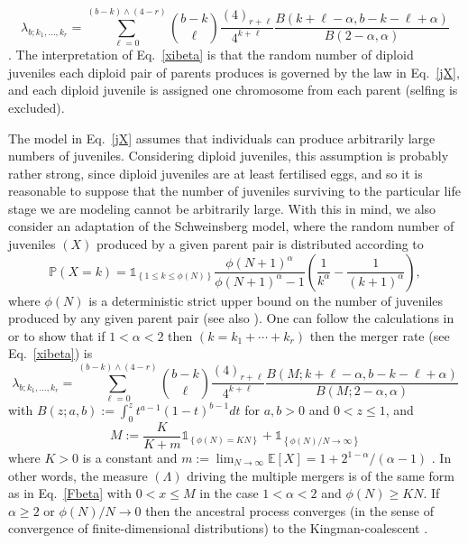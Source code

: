 \documentclass{article}
\newcommand{\be}{\begin{equation}}
\newcommand{\ee}{\end{equation}}
\newcommand{\EE}[1]{\ensuremath{\mathds{E}\left[ #1 \right]}}%
\newcommand{\one}[1]{\ensuremath{\mathds{1}_{\left\{ #1 \right\}}}}%
\newcommand{\prb}[1]{\ensuremath{\mathds{P}\left( #1 \right) } }%
\begin{document}
\be\label{xibeta}
   \lambda_{b;k_1, \ldots, k_r} = \sum_{\ell = 0}^{ (b - k)\wedge (4-r) } \binom{b-k}{\ell} \frac{ (4)_{r+\ell} }{4^{k+\ell}} \frac{B(k+\ell - \alpha, b-k-\ell + \alpha ) }{B(2-\alpha,\alpha)}
\ee
\citep{Blath2016,BLS15}. The interpretation of Eq.\ \eqref{xibeta} is  that the random   number of diploid  juveniles each  diploid pair of parents  produces  is  governed by  the law in Eq.\ \eqref{jX},   and   each diploid juvenile  is assigned  one chromosome  from each parent (selfing is excluded).   



The model in Eq.\ \eqref{jX} assumes that individuals can produce
arbitrarily large numbers of juveniles. Considering diploid juveniles,
this assumption is probably rather strong, since diploid juveniles are
at least fertilised eggs, and so it is reasonable to suppose that the
number of juveniles surviving to the  particular life stage we are modeling  cannot be
arbitrarily large.  With this in mind, we also consider an adaptation
of the Schweinsberg model, where the random number of juveniles $(X)$
produced by a   given parent pair  is distributed according to
\be\label{jtr}
  \prb{X=k} =   \one{1 \le k \le \phi(N)} \frac{\phi(N+1)^\alpha }{ \phi(N+1)^\alpha - 1 }  \left( \frac{1}{k^\alpha} - \frac{1}{(k+1)^\alpha}  \right) ,
\ee
where $\phi(N)$ is a deterministic strict upper bound on the number of juveniles produced by  any given parent pair (see also \citep{Eldon2018}).   One can follow the calculations in  \citep{schweinsberg03} or \citep{BLS15}  to show  that  if $1 < \alpha < 2$   then  $(k = k_1 + \cdots + k_r)$ then the merger rate (see Eq.\ \eqref{xibeta}) is
\be
   \lambda_{b;k_1, \ldots, k_r} =  \sum_{\ell = 0}^{ (b - k)\wedge (4-r) } \binom{b-k}{\ell} \frac{ (4)_{r+\ell} }{4^{k+\ell}} \frac{B(M; k+\ell - \alpha, b-k-\ell + \alpha ) }{B(M;2-\alpha,\alpha)}
\ee
with $B(z;a,b) := \int_0^z t^{a-1}(1-t)^{b-1}dt$ for  $a,b>0$ and $0< z\le 1$, and
\be
M :=  \frac{K}{K+m} \one{\phi(N) = KN} + \one{\phi(N)/N \to \infty }
\ee
where $K > 0$ is a constant and  $m := \lim_{N\to \infty} \EE{X} = 1 + 2^{1-\alpha}/(\alpha - 1)$ \citep{CDEE2020,AEKKZ2020}.    In other words,  the measure $(\Lambda)$ driving the multiple mergers is of the same form as in Eq.\ \eqref{Fbeta}  with $0 < x \le M$ in the case $1 < \alpha < 2$ and $\phi(N) \ge KN$.   If $\alpha \ge 2$ or $\phi(N)/N \to 0$ then  the  ancestral process converges (in the sense of convergence of  finite-dimensional distributions) to  the Kingman-coalescent \citep{CDEE2020,AEKKZ2020}.
\end{document}
